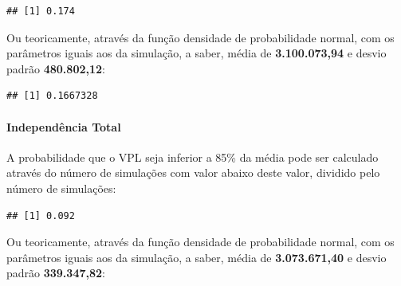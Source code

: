 \documentclass[a4paper]{article}
\newenvironment{Shaded}{\begin{snugshade}}{\end{snugshade}}
\newcommand{\KeywordTok}[1]{\textcolor[rgb]{0.13,0.29,0.53}{\textbf{#1}}}
\newcommand{\DataTypeTok}[1]{\textcolor[rgb]{0.13,0.29,0.53}{#1}}
\newcommand{\DecValTok}[1]{\textcolor[rgb]{0.00,0.00,0.81}{#1}}
\newcommand{\FloatTok}[1]{\textcolor[rgb]{0.00,0.00,0.81}{#1}}
\newcommand{\StringTok}[1]{\textcolor[rgb]{0.31,0.60,0.02}{#1}}
\newcommand{\OperatorTok}[1]{\textcolor[rgb]{0.81,0.36,0.00}{\textbf{#1}}}
\newcommand{\NormalTok}[1]{#1}
\let\oldparagraph\paragraph
\renewcommand{\paragraph}[1]{\oldparagraph{#1}\mbox{}}
\begin{document}
\begin{verbatim}
## [1] 0.174
\end{verbatim}

Ou teoricamente, através da função densidade de probabilidade normal,
com os parâmetros iguais aos da simulação, a saber, média de
\textbf{3.100.073,94} e desvio padrão \textbf{480.802,12}:

\begin{Shaded}
\end{Shaded}

\begin{verbatim}
## [1] 0.1667328
\end{verbatim}

\paragraph{Independência Total}\label{independencia-total}

A probabilidade que o VPL seja inferior a 85\% da média pode ser
calculado através do número de simulações com valor abaixo deste valor,
dividido pelo número de simulações:

\begin{Shaded}
\end{Shaded}

\begin{verbatim}
## [1] 0.092
\end{verbatim}

Ou teoricamente, através da função densidade de probabilidade normal,
com os parâmetros iguais aos da simulação, a saber, média de
\textbf{3.073.671,40} e desvio padrão \textbf{339.347,82}:

\begin{Shaded}
\end{Shaded}
\end{document}
